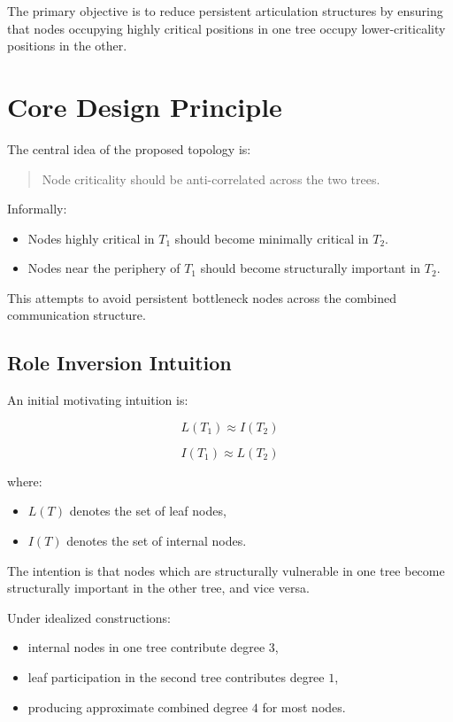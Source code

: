 \documentclass[11pt]{article}
\begin{document}
The primary objective is to reduce persistent articulation structures by ensuring that nodes occupying highly critical positions in one tree occupy lower-criticality positions in the other.

\section{Core Design Principle}

The central idea of the proposed topology is:

\begin{quote}
Node criticality should be anti-correlated across the two trees.
\end{quote}

Informally:

\begin{itemize}
    \item Nodes highly critical in \(T_1\) should become minimally critical in \(T_2\).
    \item Nodes near the periphery of \(T_1\) should become structurally important in \(T_2\).
\end{itemize}

This attempts to avoid persistent bottleneck nodes across the combined communication structure.

\subsection{Role Inversion Intuition}

An initial motivating intuition is:

\[
L(T_1) \approx I(T_2)
\]

\[
I(T_1) \approx L(T_2)
\]

where:

\begin{itemize}
    \item \(L(T)\) denotes the set of leaf nodes,
    \item \(I(T)\) denotes the set of internal nodes.
\end{itemize}

The intention is that nodes which are structurally vulnerable in one tree become structurally important in the other tree, and vice versa.

Under idealized constructions:
\begin{itemize}
    \item internal nodes in one tree contribute degree \(3\),
    \item leaf participation in the second tree contributes degree \(1\),
    \item producing approximate combined degree \(4\) for most nodes.
\end{itemize}
\end{document}
